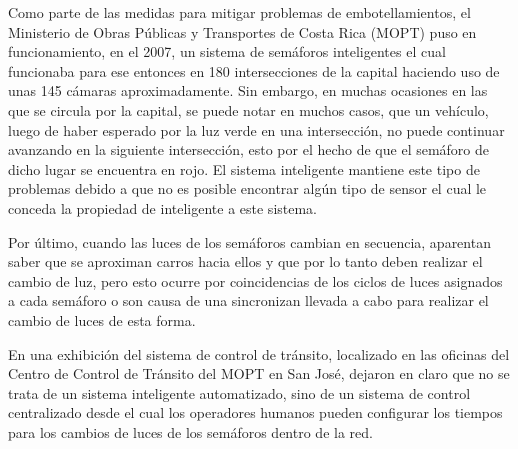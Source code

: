 \documentclass[conference]{IEEEtran}
\begin{document}
Como parte de las medidas para mitigar problemas de embotellamientos, el
	Ministerio de Obras P\'{u}blicas y Transportes de Costa Rica (MOPT) puso en funcionamiento,
	en el 2007, un sistema de sem\'{a}foros inteligentes el cual funcionaba para
	ese entonces en 180 intersecciones de la capital haciendo uso de unas 145
	c\'{a}maras aproximadamente. Sin embargo, en muchas ocasiones en las que se
	circula por la capital, se puede notar en muchos
	casos, que un veh\'{i}culo, luego de haber esperado por la luz verde en una intersecci\'on,  no puede continuar  avanzando en la siguiente intersecci\'on, esto por el hecho
	de que el sem\'{a}foro de dicho lugar se encuentra en rojo. El sistema inteligente mantiene este tipo de
	problemas debido a que no es
	posible encontrar alg\'{u}n tipo de sensor el cual le conceda la propiedad de inteligente a este sistema.\cite{Loaiza2007}
		
		Por \'{u}ltimo, cuando las luces de los sem\'{a}foros cambian en secuencia, aparentan
	saber que se aproximan carros hacia ellos y que por lo tanto deben realizar el
	cambio de luz, pero esto ocurre por coincidencias de los ciclos de luces
	asignados a cada sem\'{a}foro o son causa de una sincronizan llevada a cabo para realizar el cambio de luces de esta forma.

		En una exhibici\'{o}n del sistema de control de tr\'{a}nsito, localizado en las
	oficinas del Centro de Control de Tr\'{a}nsito del MOPT en San Jos\'{e}, dejaron en claro que no se trata de un sistema inteligente automatizado,
	sino de un sistema de control centralizado desde el cual los operadores humanos pueden configurar los tiempos para los cambios de luces de los
	sem\'{a}foros dentro de la red. 


%
%
\end{document}

